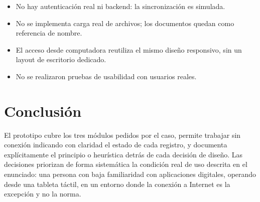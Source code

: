 \documentclass[11pt,a4paper]{article}
\begin{document}
\begin{itemize}[leftmargin=1.3em]
  \item No hay autenticación real ni backend: la sincronización es simulada.
  \item No se implementa carga real de archivos; los documentos quedan como referencia de nombre.
  \item El acceso desde computadora reutiliza el mismo diseño responsivo, sin un layout de escritorio dedicado.
  \item No se realizaron pruebas de usabilidad con usuarios reales.
\end{itemize}

\FloatBarrier
\section{Conclusión}

El prototipo cubre los tres módulos pedidos por el caso, permite trabajar sin conexión indicando con
claridad el estado de cada registro, y documenta explícitamente el principio o heurística detrás de cada
decisión de diseño. Las decisiones priorizan de forma sistemática la condición real de uso descrita en el
enunciado: una persona con baja familiaridad con aplicaciones digitales, operando desde una tableta táctil,
en un entorno donde la conexión a Internet es la excepción y no la norma.
\end{document}
